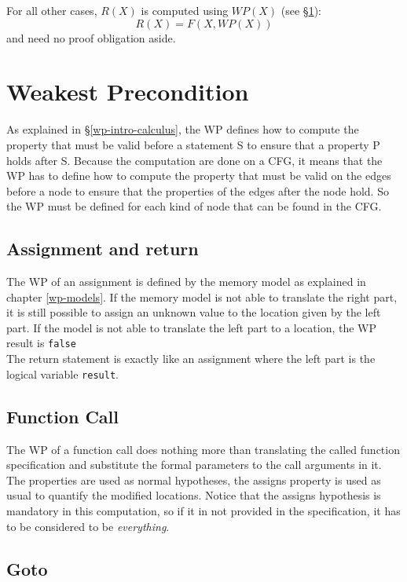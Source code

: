For all other cases, $R(X)$ is computed using $WP(X)$ (see \S\ref{sec-wp}):
\[
R(X) = F (X, WP(X))
\]
and need no proof obligation aside.

\section{Weakest Precondition}\label{sec-wp}

As explained in \S\ref{wp-intro-calculus},
the WP defines how to compute the property that must be valid before
a statement S to ensure that a property P holds after S.
Because the computation are done on a CFG, it means that the WP has to define
how to compute the property that must be valid on the edges before a node
to ensure that the properties of the edges after the node hold.
So the WP must be defined for each kind of node that can be found in the CFG.

\subsection{Assignment and return}\label{def-wp-asgn}

The WP of an assignment is defined by the memory model as explained in chapter
\ref{wp-models}.
If the memory model is not able to translate the right part,
it is still possible to assign an unknown value to the location
given by the left part. If the model is not able to translate
the left part to a location, the WP result is {\tt false}\\

The return statement is exactly like an assignment 
where the left part is the logical variable {\tt result}.

\subsection{Function Call}\label{def-wp-call}

The WP of a function call does nothing more than translating the called function
specification and substitute the formal parameters to the call arguments
in it.
The properties are used as normal hypotheses, the assigns property
is used as usual to quantify the modified locations.
Notice that the assigns hypothesis is mandatory in this computation, 
so if it in not provided
in the specification, it has to be considered to be {\it everything}.

\subsection{Goto}\label{def-wp-goto}

